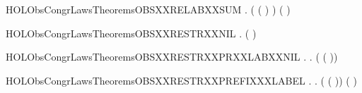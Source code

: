 \newcommand{\HOLObsCongrLawsTheoremsOBSXXRELABXXPREFIX}{\UseVerbatim{HOLObsCongrLawsTheoremsOBSXXRELABXXPREFIX}}
\begin{SaveVerbatim}{HOLObsCongrLawsTheoremsOBSXXRELABXXSUM}
\HOLTokenTurnstile{} \HOLSymConst{\HOLTokenForall{}}  .
        ( ( \HOLSymConst{+} ) ) (   \HOLSymConst{+}   )
\end{SaveVerbatim}
\newcommand{\HOLObsCongrLawsTheoremsOBSXXRELABXXSUM}{\UseVerbatim{HOLObsCongrLawsTheoremsOBSXXRELABXXSUM}}
\begin{SaveVerbatim}{HOLObsCongrLawsTheoremsOBSXXRESTRXXNIL}
\HOLTokenTurnstile{} \HOLSymConst{\HOLTokenForall{}}.  (\HOLConst{\ensuremath{\nu}}  ) 
\end{SaveVerbatim}
\newcommand{\HOLObsCongrLawsTheoremsOBSXXRESTRXXNIL}{\UseVerbatim{HOLObsCongrLawsTheoremsOBSXXRESTRXXNIL}}
\begin{SaveVerbatim}{HOLObsCongrLawsTheoremsOBSXXRESTRXXPRXXLABXXNIL}
\HOLTokenTurnstile{} \HOLSymConst{\HOLTokenForall{}} .
        \HOLConst{\HOLTokenIn{}}  \HOLSymConst{\HOLTokenDisj{}}   \HOLConst{\HOLTokenIn{}}  \HOLSymConst{\HOLTokenImp{}}
       \HOLSymConst{\HOLTokenForall{}}.  (\HOLConst{\ensuremath{\nu}}  ( )) 
\end{SaveVerbatim}
\newcommand{\HOLObsCongrLawsTheoremsOBSXXRESTRXXPRXXLABXXNIL}{\UseVerbatim{HOLObsCongrLawsTheoremsOBSXXRESTRXXPRXXLABXXNIL}}
\begin{SaveVerbatim}{HOLObsCongrLawsTheoremsOBSXXRESTRXXPREFIXXXLABEL}
\HOLTokenTurnstile{} \HOLSymConst{\HOLTokenForall{}} .
        \HOLConst{\HOLTokenNotIn{}}  \HOLSymConst{\HOLTokenConj{}}   \HOLConst{\HOLTokenNotIn{}}  \HOLSymConst{\HOLTokenImp{}}
       \HOLSymConst{\HOLTokenForall{}}.  (\HOLConst{\ensuremath{\nu}}  ( )) ( \HOLConst{\ensuremath{\nu}}  )
\end{SaveVerbatim}
